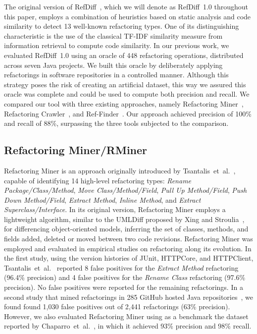 The original version of RefDiff~\cite{msr2017}, which we will denote as RefDiff~1.0 throughout this paper, employs a combination of heuristics based on static analysis and code similarity to detect 13 well-known refactoring types.
One of its distinguishing characteristic is the use of the classical TF-IDF similarity measure from information retrieval to compute code similarity.
In our previous work, we evaluated RefDiff~1.0 using an oracle of 448 refactoring operations, distributed across seven Java projects.
We built this oracle by deliberately applying refactorings in software repositories in a controlled manner.
Although this strategy poses the risk of creating an artificial dataset, this way we assured this oracle was complete and could be used to compute both precision and recall.
We compared our tool with three existing approaches, namely Refactoring Miner~\cite{tsantalis_empiricalstudy}, Refactoring Crawler~\cite{dig2006automated}, and Ref-Finder~\cite{Kim:2010:RefFinder}.
Our approach achieved precision of 100\% and recall of 88\%, surpassing the three tools subjected to the comparison.


\subsection{Refactoring Miner/RMiner}

Refactoring Miner is an approach originally introduced by Tsantalis~et~al.~\cite{tsantalis_empiricalstudy}, capable of identifying 14 high-level refactoring types: \emph{Rename Package/Class/Method}, \emph{Move Class/Method/Field}, \emph{Pull Up Method/Field}, \emph{Push Down Method/Field}, \emph{Extract Method}, \emph{Inline Method}, and \emph{Extract Superclass/Interface}.
In its original version, Refactoring Miner employs a lightweight algorithm, similar to the UMLDiff proposed by Xing and Stroulia~\cite{Xing:2005}, for differencing object-oriented models, inferring the set of classes, methods, and fields added, deleted or moved between two code revisions. 
Refactoring Miner was employed and evaluated in empirical studies on refactoring along its evolution.
In the first study, using the version histories of JUnit, HTTPCore, and HTTPClient, Tsantalis~et~al.~\cite{tsantalis_empiricalstudy} reported 8 false positives for the \emph{Extract Method} refactoring (96.4\% precision) and 4 false positives for the \emph{Rename Class} refactoring (97.6\% precision). No false positives were reported for the remaining refactorings.
In a second study that mined refactorings in 285 GitHub hosted Java repositories~\cite{fse2016-why-we-refactor}, we found found 1,030 false positives out of 2,441 refactorings (63\% precision). However, we also evaluated Refactoring Miner using as a benchmark the dataset reported by Chaparro~et~al.~\cite{Chaparro:2014}, in which it achieved 93\% precision and 98\% recall.

